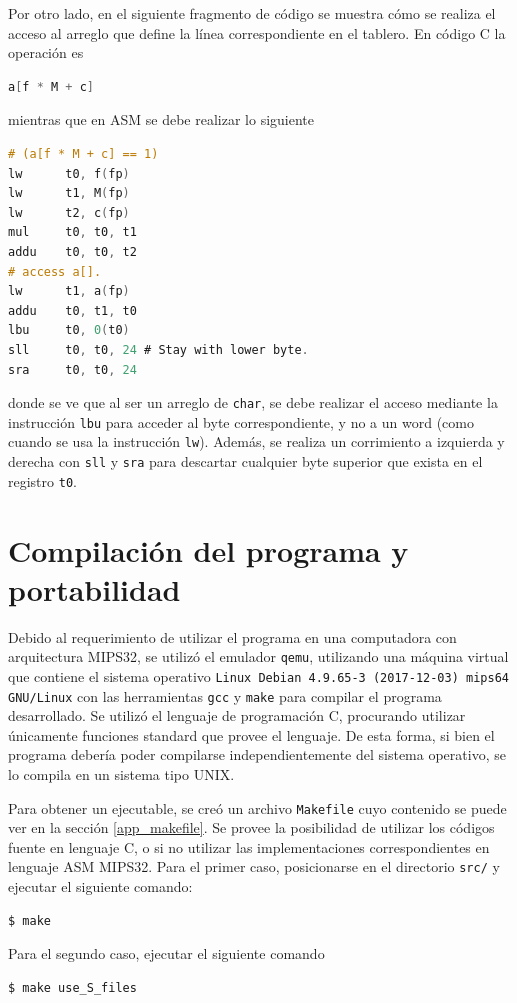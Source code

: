 \documentclass[a4paper,12pt]{article}
\numberwithin{equation}{section}
\numberwithin{figure}{section}
\begin{document}
Por otro lado, en el siguiente fragmento de código se muestra cómo se realiza el acceso al arreglo que define la línea correspondiente en el tablero. En código C la operación es
\begin{lstlisting}[language=C, style=StyleC]
a[f * M + c]
\end{lstlisting}
mientras que en ASM se debe realizar lo siguiente
\begin{lstlisting}[language=C, style=StyleC]
# (a[f * M + c] == 1)
lw		t0, f(fp)
lw		t1, M(fp)
lw		t2, c(fp)
mul     t0, t0, t1
addu    t0, t0, t2
# access a[].
lw      t1, a(fp)
addu    t0, t1, t0
lbu		t0, 0(t0)
sll     t0, t0, 24 # Stay with lower byte.
sra     t0, t0, 24
\end{lstlisting}
donde se ve que al ser un arreglo de \texttt{char}, se debe realizar el acceso mediante la instrucción \texttt{lbu} para acceder al byte correspondiente, y no a un word (como cuando se usa la instrucción \texttt{lw}). Además, se realiza un corrimiento a izquierda y derecha con \texttt{sll} y \texttt{sra} para descartar cualquier byte superior que exista en el registro \texttt{t0}.

\section{Compilación del programa y portabilidad}

Debido al requerimiento de utilizar el programa en una computadora con arquitectura MIPS32, se utilizó el emulador \texttt{qemu}, utilizando una máquina virtual que contiene el sistema operativo \texttt{Linux Debian 4.9.65-3 (2017-12-03) mips64 GNU/Linux} con las herramientas \texttt{gcc} y \texttt{make} para compilar el programa desarrollado. Se utilizó el lenguaje de programación C, procurando utilizar únicamente funciones standard que provee el lenguaje. De esta forma, si bien el programa debería poder compilarse independientemente del sistema operativo, se lo compila en un sistema tipo UNIX.

Para obtener un ejecutable, se creó un archivo \texttt{Makefile} cuyo contenido se puede ver en la sección \ref{app_makefile}. Se provee la posibilidad de utilizar los códigos fuente en lenguaje C, o si no utilizar las implementaciones correspondientes en lenguaje ASM MIPS32. Para el primer caso, posicionarse en el directorio \texttt{src/} y ejecutar el siguiente comando:
\begin{lstlisting}[language=bash, style=StyleC]
$ make 
\end{lstlisting}
Para el segundo caso, ejecutar el siguiente comando
\begin{lstlisting}[language=bash, style=StyleC]
$ make use_S_files
\end{lstlisting}
\end{document}
